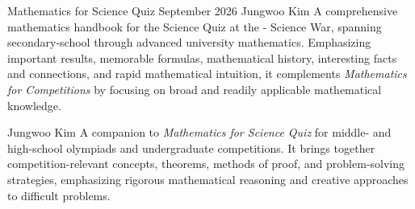 
\cvwrittenwork
  {Mathematics for Science Quiz}
  {September 2026}
  {Jungwoo Kim}
  {A comprehensive mathematics handbook for the Science Quiz at the - Science War, spanning secondary-school through advanced university mathematics. Emphasizing important results, memorable formulas, mathematical history, interesting facts and connections, and rapid mathematical intuition, it complements \textit{Mathematics for Competitions} by focusing on broad and readily applicable mathematical knowledge.}

\cvspace

  {}
  {Jungwoo Kim}
  {A companion to \textit{Mathematics for Science Quiz} for middle- and high-school olympiads and undergraduate competitions. It brings together competition-relevant concepts, theorems, methods of proof, and problem-solving strategies, emphasizing rigorous mathematical reasoning and creative approaches to difficult problems.}

